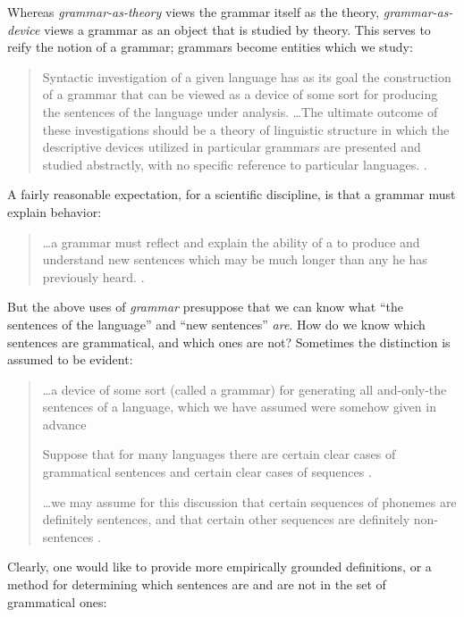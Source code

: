   Whereas \textit{grammar-as-theory} views the grammar itself as the theory, \textit{grammar-as-device} views a grammar as an object that is studied by theory. This serves to reify the notion of a grammar; grammars become entities which we study:

\begin{quote}
Syntactic investigation of a given language has as its goal the construction of a grammar that can be viewed as a device of some sort for producing the sentences of the language under analysis. …The ultimate outcome of these investigations should be a theory of linguistic structure in which the descriptive devices utilized in particular grammars are presented and studied abstractly, with no specific reference to particular languages. \citep[11]{Chomsky1957}.
\end{quote}

A fairly reasonable expectation, for a scientific discipline, is that a grammar must explain behavior:

\begin{quote}
…a grammar must reflect and explain the ability of a  to produce and understand new sentences which may be much longer than any he has previously heard. \citep[124]{Chomsky1956}.
\end{quote}

  But the above uses of \textit{grammar} presuppose that we can know what “the sentences of the language” and “new sentences” \textit{are}. How do we know which sentences are grammatical, and which ones are not? Sometimes the distinction is assumed to be evident:

\begin{quote}
…a device of some sort (called a grammar) for generating all and-only-the sentences of a language, which we have assumed were somehow given in advance \citep[85]{Chomsky1957}

Suppose that for many languages there are certain clear cases of grammatical sentences and certain clear cases of  sequences \citep[113]{Chomsky1956}.

…we may assume for this discussion that certain sequences of phonemes are definitely sentences, and that certain other sequences are definitely non-sentences \citep[14]{Chomsky1957}.
\end{quote}

Clearly, one would like to provide more empirically grounded definitions, or a method for determining which sentences are and are not in the set of grammatical ones:

